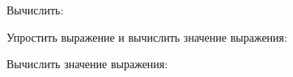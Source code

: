 \begin{listofex}
	\item {}
	\item Вычислить:
	\begin{enumcols}[itemcolumns=3]
		\item {}
		\item {}
		\item {}
	\end{enumcols}
	\item Упростить выражение и вычислить значение выражения:
	\begin{enumcols}[itemcolumns=1]
		\item {}
		\item {}
	\end{enumcols}
	\item Вычислить значение выражения:
	\begin{enumcols}[itemcolumns=1]
		\item {}
		\item {}
		\item {}
	\end{enumcols}
	\item {}
\end{listofex}